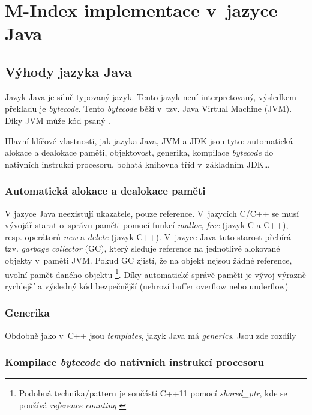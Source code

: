 \chapter{M-Index implementace v~jazyce Java}


\section{Výhody jazyka Java}

Jazyk Java je silně typovaný jazyk\@. Tento jazyk není interpretovaný,
výsledkem překladu je \emph{bytecode}\@. Tento \emph{bytecode} běží
v~tzv. Java Virtual Machine (JVM)\@.
Díky JVM může kód psaný \emph{}\@.

Hlavní klíčové vlastnosti, jak jazyka Java, JVM a JDK
jsou tyto: automatická alokace a dealokace paměti, objektovost, generika,
kompilace \emph{bytecode} do nativních instrukcí procesoru, bohatá
knihovna tříd v~základním JDK\ldots{}


\subsection{Automatická alokace a dealokace paměti}

V jazyce Java neexistují ukazatele, pouze reference. V~jazycích C/C++
se musí vývojář starat o~správu paměti pomocí funkcí \emph{malloc},
\emph{free} (jazyk C a C++), resp. operátorů \emph{new} a \emph{delete}
(jazyk C++)\@. V~jazyce Java tuto starost přebírá tzv. \emph{garbage
collector} (GC), který sleduje
reference na jednotlivé alokované objekty v~paměti JVM. Pokud GC
zjistí, že na objekt nejsou žádné reference, uvolní pamět daného objektu%
\footnote{Podobná technika/pattern je součástí C++11 pomocí \emph{shared\_ptr},
kde se používá \emph{reference counting} \cite{ISO:2012:CPP}
}. Díky automatické správě paměti je vývoj výrazně rychlejší a výsledný
kód bezpečnější (nehrozí buffer overflow nebo underflow)


\subsection{Generika}

Obdobně jako v~C++ jsou \emph{templates}, jazyk Java má \emph{generics}.
Jsou zde rozdíly


\subsection{Kompilace \emph{bytecode} do nativních instrukcí procesoru}

